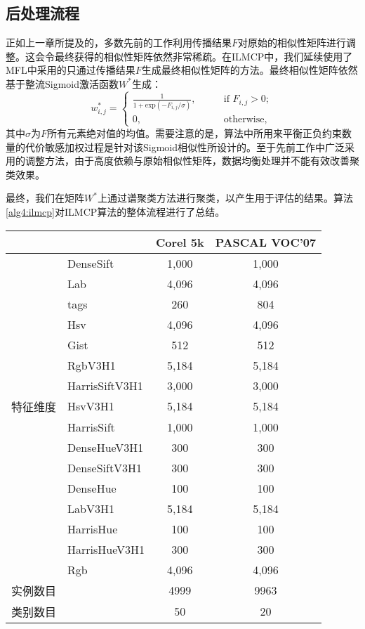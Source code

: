 \subsection{后处理流程}
\label{sec4:sigmoid}
正如上一章所提及的，多数先前的工作利用传播结果$F$对原始的相似性矩阵进行调整。这会令最终获得的相似性矩阵依然非常稀疏。在ILMCP中，我们延续使用了MFL中采用的只通过传播结果$F$生成最终相似性矩阵的方法。最终相似性矩阵依然基于整流Sigmoid激活函数$W^*$生成：
\begin{equation}
{w}^*_{i,j} = 
\begin{cases}
\frac{1}{1+\text{exp}(-{F}_{i,j}/\sigma)}, \qquad &\text{if }{F}_{i,j}>0;\\
0, &\text{otherwise, }
\end{cases}
\label{eq4:sig}
\end{equation}
其中$\sigma$为$F$所有元素绝对值的均值。需要注意的是，算法中所用来平衡正负约束数量的代价敏感加权过程是针对该Sigmoid相似性所设计的。至于先前工作中广泛采用的调整方法，由于高度依赖与原始相似性矩阵，数据均衡处理并不能有效改善聚类效果。

最终，我们在矩阵$W^*$上通过谱聚类方法进行聚类\cite{von2007tutorial}，以产生用于评估的结果。算法\ref{alg4:ilmcp}对ILMCP算法的整体流程进行了总结。


\begin{table}[t]
	\label{tab4:Data}
	\centering
	\setlength{\tabcolsep}{15pt}
	\begin{tabular}{l l c c}
		\toprule
		& & Corel 5k & PASCAL VOC'07\\
		\midrule
		&DenseSift&  1,000 & 1,000 \\
		&Lab&  4,096 & 4,096 \\
		&tags&  260& 804 \\
		&Hsv&  4,096 & 4,096 \\
		&Gist&  512 & 512 \\
		&RgbV3H1&  5,184 & 5,184\\
		&HarrisSiftV3H1&  3,000 & 3,000 \\
		特征维度&HsvV3H1& 5,184 & 5,184\\
		&HarrisSift&  1,000 & 1,000 \\
		&DenseHueV3H1&  300 & 300 \\
		&DenseSiftV3H1&  300 & 300 \\
		&DenseHue&  100 & 100 \\
		&LabV3H1&  5,184 & 5,184 \\
		&HarrisHue&  100 & 100 \\
		&HarrisHueV3H1&  300 & 300 \\
		&Rgb&  4,096 & 4,096 \\
		\midrule
		实例数目 &&4999 & 9963 \\
		类别数目 &&50 & 20 \\
		\bottomrule
	\end{tabular}
\end{table}

